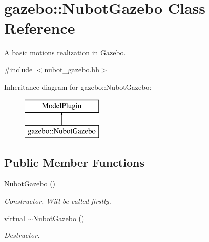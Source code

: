 \hypertarget{classgazebo_1_1NubotGazebo}{\section{gazebo\-:\-:Nubot\-Gazebo Class Reference}
\label{classgazebo_1_1NubotGazebo}
}


A basic motions realization in Gazebo.  




{\ttfamily \#include $<$nubot\-\_\-gazebo.\-hh$>$}

Inheritance diagram for gazebo\-:\-:Nubot\-Gazebo\-:\begin{figure}[H]
\begin{center}
\leavevmode
\includegraphics[height=2.000000cm]{classgazebo_1_1NubotGazebo}
\end{center}
\end{figure}
\subsection*{Public Member Functions}
\begin{DoxyCompactItemize}
\item 
\hyperlink{classgazebo_1_1NubotGazebo_a6c8d0be666316dfa03c49ec0a5e01e96}{Nubot\-Gazebo} ()
\begin{DoxyCompactList}\small\item\em Constructor. Will be called firstly. \end{DoxyCompactList}\item 
virtual \hyperlink{classgazebo_1_1NubotGazebo_a90ec014dbd4dcad3f1f0c78771fd4e63}{$\sim$\-Nubot\-Gazebo} ()
\begin{DoxyCompactList}\small\item\em Destructor. \end{DoxyCompactList}\end{DoxyCompactItemize}
